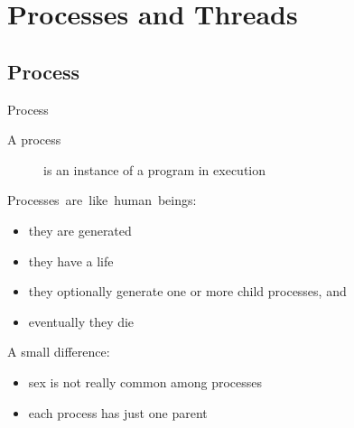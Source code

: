 



\section{Processes and Threads}
\label{sec:processes-threads}

\subsection{Process}
\label{sec:process}

\begin{frame}{Process}
  \begin{description}
  \item[A process] is an instance of a program in execution
  \end{description}
  \begin{minipage}{.65\linewidth}
    \begin{block}{\mbox{Processes are like human beings:}}
        \begin{itemize}
        \item[\Symbol{➠}] they are generated
        \item[\Symbol{➠}] they have a life
        \item[\Symbol{➠}] they optionally generate one or more child processes, and
        \item[\Symbol{➠}] eventually they die
        \end{itemize}
        A small difference:
        \begin{itemize}
        \item sex is not really common among processes
        \item each process has just one parent
        \end{itemize}
      \end{block}
  \end{minipage}\quad
  \begin{minipage}{.3\linewidth}
    \begin{center}
    \end{center}
  \end{minipage}
\end{frame}

